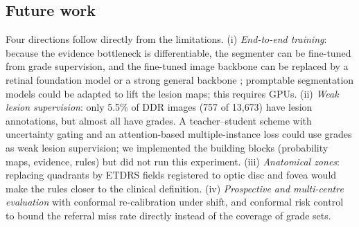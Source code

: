 \subsection{Future work}
Four directions follow directly from the limitations. (i) \emph{End-to-end training}: because the evidence bottleneck is differentiable, the segmenter can be fine-tuned from grade supervision, and the fine-tuned image backbone can be replaced by a retinal foundation model \citep{zhou2023retfound,qiu2024visionfm,silva2025flair} or a strong general backbone \citep{woo2023convnextv2,oquab2024dinov2}; promptable segmentation models \citep{kirillov2023sam,ma2024medsam} could be adapted to lift the lesion maps; this requires GPUs. (ii) \emph{Weak lesion supervision}: only 5.5\% of DDR images (757 of 13{,}673) have lesion annotations, but almost all have grades. A teacher--student scheme \citep{tarvainen2017meanteacher} with uncertainty gating \citep{gal2016dropout} and an attention-based multiple-instance loss \citep{ilse2018attentionmil} could use grades as weak lesion supervision; we implemented the building blocks (probability maps, evidence, rules) but did not run this experiment. (iii) \emph{Anatomical zones}: replacing quadrants by ETDRS fields registered to optic disc and fovea would make the rules closer to the clinical definition. (iv) \emph{Prospective and multi-centre evaluation} with conformal re-calibration under shift, and conformal risk control \citep{angelopoulos2024crc} to bound the referral miss rate directly instead of the coverage of grade sets.
